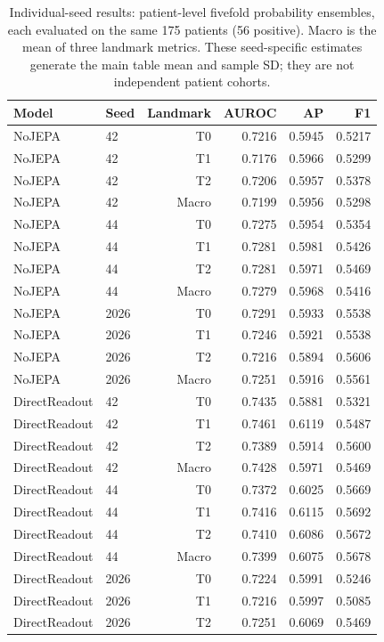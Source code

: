 \begin{table}[t]
\centering
\small
\caption{Individual-seed results: patient-level fivefold probability ensembles, each evaluated on the same 175 patients (56 positive). Macro is the mean of three landmark metrics. These seed-specific estimates generate the main table mean and sample SD; they are not independent patient cohorts.}
\label{tab:seedresults}
\begin{tabular}{llrrrr}
\toprule
Model & Seed & Landmark & AUROC & AP & F1 \\
\midrule
NoJEPA & 42 & T0 & 0.7216 & 0.5945 & 0.5217 \\
NoJEPA & 42 & T1 & 0.7176 & 0.5966 & 0.5299 \\
NoJEPA & 42 & T2 & 0.7206 & 0.5957 & 0.5378 \\
NoJEPA & 42 & Macro & 0.7199 & 0.5956 & 0.5298 \\
NoJEPA & 44 & T0 & 0.7275 & 0.5954 & 0.5354 \\
NoJEPA & 44 & T1 & 0.7281 & 0.5981 & 0.5426 \\
NoJEPA & 44 & T2 & 0.7281 & 0.5971 & 0.5469 \\
NoJEPA & 44 & Macro & 0.7279 & 0.5968 & 0.5416 \\
NoJEPA & 2026 & T0 & 0.7291 & 0.5933 & 0.5538 \\
NoJEPA & 2026 & T1 & 0.7246 & 0.5921 & 0.5538 \\
NoJEPA & 2026 & T2 & 0.7216 & 0.5894 & 0.5606 \\
NoJEPA & 2026 & Macro & 0.7251 & 0.5916 & 0.5561 \\
DirectReadout & 42 & T0 & 0.7435 & 0.5881 & 0.5321 \\
DirectReadout & 42 & T1 & 0.7461 & 0.6119 & 0.5487 \\
DirectReadout & 42 & T2 & 0.7389 & 0.5914 & 0.5600 \\
DirectReadout & 42 & Macro & 0.7428 & 0.5971 & 0.5469 \\
DirectReadout & 44 & T0 & 0.7372 & 0.6025 & 0.5669 \\
DirectReadout & 44 & T1 & 0.7416 & 0.6115 & 0.5692 \\
DirectReadout & 44 & T2 & 0.7410 & 0.6086 & 0.5672 \\
DirectReadout & 44 & Macro & 0.7399 & 0.6075 & 0.5678 \\
DirectReadout & 2026 & T0 & 0.7224 & 0.5991 & 0.5246 \\
DirectReadout & 2026 & T1 & 0.7216 & 0.5997 & 0.5085 \\
DirectReadout & 2026 & T2 & 0.7251 & 0.6069 & 0.5469 \\

\end{tabular}
\end{table}
